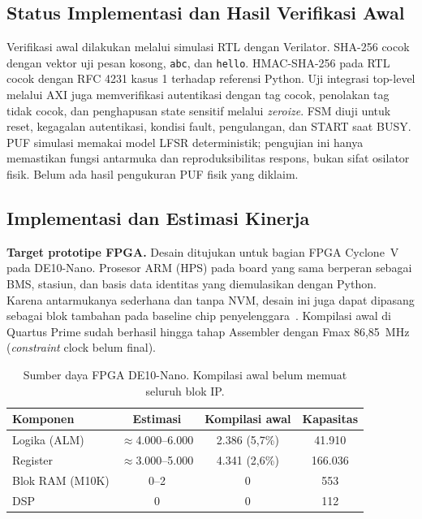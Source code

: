 \documentclass[11pt,a4paper]{article}
\newcommand{\hdr}[1]{\cellcolor{hdrgreen}\textbf{#1}}
\renewcommand{\arraystretch}{1.3}
\begin{document}
\subsection{Status Implementasi dan Hasil Verifikasi Awal}

Verifikasi awal dilakukan melalui simulasi RTL dengan Verilator.
SHA-256 cocok dengan vektor uji pesan kosong, \texttt{abc}, dan
\texttt{hello}. HMAC-SHA-256 pada RTL cocok dengan RFC 4231 kasus 1
terhadap referensi Python. Uji integrasi top-level melalui AXI juga
memverifikasi autentikasi dengan tag cocok, penolakan tag tidak cocok,
dan penghapusan state sensitif melalui \emph{zeroize}. FSM diuji untuk
reset, kegagalan autentikasi, kondisi fault, pengulangan, dan START saat
BUSY. PUF simulasi memakai model LFSR deterministik; pengujian ini hanya
memastikan fungsi antarmuka dan reproduksibilitas respons, bukan sifat
osilator fisik. Belum ada hasil pengukuran PUF fisik yang diklaim.

\subsection{Implementasi dan Estimasi Kinerja}

\textbf{Target prototipe FPGA.} Desain ditujukan untuk bagian FPGA Cyclone~V pada DE10-Nano. Prosesor ARM (HPS) pada board yang sama berperan sebagai BMS, stasiun, dan basis data identitas yang diemulasikan dengan Python. Karena antarmukanya sederhana dan tanpa NVM, desain ini juga dapat dipasang sebagai blok tambahan pada baseline chip penyelenggara~\cite{peruri}. Kompilasi awal di Quartus Prime sudah berhasil hingga tahap Assembler dengan Fmax 86,85~MHz (\emph{constraint} clock belum final).

\begin{table}[!b]
\centering
\small
\renewcommand{\arraystretch}{1.15}
\begin{tabular}{|l|c|c|c|}
\hline
\hdr{Komponen} & \hdr{Estimasi} & \hdr{Kompilasi awal} & \hdr{Kapasitas} \\ \hline
Logika (ALM) & $\approx$4.000--6.000 & 2.386 (5,7\%) & 41.910 \\ \hline
Register & $\approx$3.000--5.000 & 4.341 (2,6\%) & 166.036 \\ \hline
Blok RAM (M10K) & 0--2 & 0 & 553 \\ \hline
DSP & 0 & 0 & 112 \\ \hline
\end{tabular}
\caption{Sumber daya FPGA DE10-Nano. Kompilasi awal belum memuat seluruh blok IP.}
\end{table}
\end{document}
